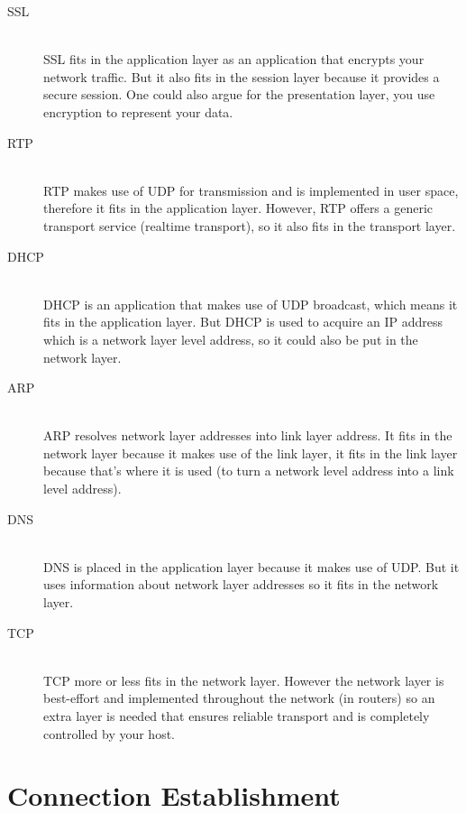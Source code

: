 \documentclass[9pt, a4paper, oneside]{article}
\begin{document}
\begin{multicols}{2}
\begin{description}
    \item[SSL] \hfill \\
        SSL fits in the application layer as an application that encrypts your
        network traffic.
        But it also fits in the session layer because it provides a secure
        session.
        One could also argue for the presentation layer, you use encryption
        to represent your data.
    \item[RTP] \hfill \\
        RTP makes use of UDP for transmission and is implemented in user space,
        therefore it fits in the application layer.
        However, RTP offers a generic transport service (realtime transport),
        so it also fits in the transport layer.
    \item[DHCP] \hfill \\
        DHCP is an application that makes use of UDP broadcast, which means
        it fits in the application layer.
        But DHCP is used to acquire an IP address which is a network layer
        level address, so it could also be put in the network layer.
    \item[ARP] \hfill \\
        ARP resolves network layer addresses into link layer address.
        It fits in the network layer because it makes use of the link layer,
        it fits in the link layer because that's where it is used (to turn a
        network level address into a link level address).
    \item[DNS] \hfill \\
        DNS is placed in the application layer because it makes use of UDP.
        But it uses information about network layer addresses so it fits in
        the network layer.
    \item[TCP] \hfill \\
        TCP more or less fits in the network layer.
        However the network layer is best-effort and implemented throughout
        the network (in routers) so an extra layer is needed that ensures
        reliable transport and is completely controlled by your host.
\end{description}
\end{multicols}

\section{Connection Establishment}
\end{document}
